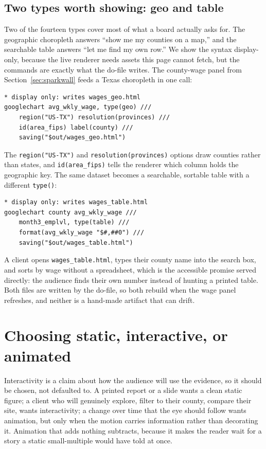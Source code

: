 \documentclass[
    a4paper,
    fontsize=10pt,
    twoside=true,
    numbers=noenddot,
]{kaobook}
\begin{document}
\subsection{Two types worth showing: geo and table}
Two of the fourteen types cover most of what a board actually asks for. The geographic choropleth answers \enquote{show me my counties on a map,} and the searchable table answers \enquote{let me find my own row.} We show the syntax display-only, because the live renderer needs assets this page cannot fetch, but the commands are exactly what the do-file writes. The county-wage panel from Section~\ref{sec:sparkwall} feeds a Texas choropleth in one call:
{\footnotesize
\begin{verbatim}
* display only: writes wages_geo.html
googlechart avg_wkly_wage, type(geo) ///
    region("US-TX") resolution(provinces) ///
    id(area_fips) label(county) ///
    saving("$out/wages_geo.html")
\end{verbatim}
}
The \texttt{region("US-TX")} and \texttt{resolution(provinces)} options draw counties rather than states, and \texttt{id(area\_fips)} tells the renderer which column holds the geographic key. The same dataset becomes a searchable, sortable table with a different \texttt{type()}:
{\footnotesize
\begin{verbatim}
* display only: writes wages_table.html
googlechart county avg_wkly_wage ///
    month3_emplvl, type(table) ///
    format(avg_wkly_wage "$#,##0") ///
    saving("$out/wages_table.html")
\end{verbatim}
}
A client opens \texttt{wages\_table.html}, types their county name into the search box, and sorts by wage without a spreadsheet, which is the accessible promise served directly: the audience finds their own number instead of hunting a printed table. Both files are written by the do-file, so both rebuild when the wage panel refreshes, and neither is a hand-made artifact that can drift.

\section{Choosing static, interactive, or animated}
Interactivity is a claim about how the audience will use the evidence, so it should be chosen, not defaulted to. A printed report or a slide wants a clean static figure; a client who will genuinely explore, filter to their county, compare their site, wants interactivity; a change over time that the eye should follow wants animation, but only when the motion carries information rather than decorating it. Animation that adds nothing subtracts, because it makes the reader wait for a story a static small-multiple would have told at once.
\end{document}
